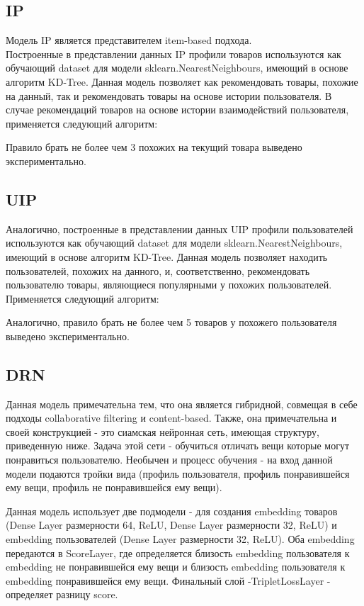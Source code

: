 \documentclass[14pt]{mmcs_article}
\begin{document}
\subsection{IP}
Модель IP является представителем item-based подхода. \\
Построенные в представлении данных IP профили товаров используются как обучающий dataset для модели sklearn.NearestNeighbours, имеющий в основе алгоритм KD-Tree. Данная модель позволяет как рекомендовать товары, похожие на данный, так и рекомендовать товары на основе истории пользователя.  
В случае рекомендаций товаров на основе истории взаимодействий пользователя, применяется следующий алгоритм:

Правило брать не более чем 3 похожих на текущий товара выведено экспериментально.
\subsection{UIP}
Аналогично, построенные в представлении данных UIP профили пользователей используются как обучающий dataset для модели sklearn.NearestNeighbours, имеющий в основе алгоритм KD-Tree. Данная модель позволяет находить пользователей, похожих на данного, и, соответственно, рекомендовать пользователю товары, являющиеся популярными у похожих пользователей.
Применяется следующий алгоритм:

Аналогично, правило брать не более чем 5 товаров у похожего пользователя выведено экспериментально.
\subsection{DRN}

Данная модель примечательна тем, что она является гибридной, совмещая в себе подходы collaborative filtering и content-based. Также, она примечательна и своей конструкцией - это сиамская нейронная сеть, имеющая структуру, приведенную ниже. Задача этой сети - обучиться отличать вещи которые могут понравиться пользователю. Необычен и процесс обучения - на вход данной модели подаются тройки вида (профиль пользователя, профиль понравившейся ему вещи, профиль не понравившейся ему вещи).

Данная модель использует две подмодели - для создания embedding товаров (Dense Layer размерности 64, ReLU, Dense Layer размерности 32, ReLU) и embedding пользователей (Dense Layer размерности 32, ReLU). Оба embedding передаются в ScoreLayer, где определяется близость embedding пользователя к embedding не понравившейся ему вещи и близость embedding пользователя к embedding понравившейся ему вещи.  Финальный слой -TripletLossLayer - определяет разницу score.
\end{document}
